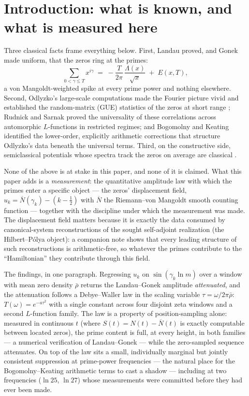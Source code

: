 \documentclass[11pt]{article}
\theoremstyle{definition}
\theoremstyle{remark}
\newcommand{\Nbar}{\overline{N}}
\begin{document}
\section{Introduction: what is known, and what is measured here}

Three classical facts frame everything below. First, Landau \cite{Landau} proved, and Gonek
\cite{Gonek} made uniform, that the zeros ring at the primes:
\[
\sum_{0<\gamma\le T} x^{i\gamma} \;=\; -\frac{T}{2\pi}\,\frac{\Lambda(x)}{\sqrt{x}} \;+\; E(x,T),
\]
a von Mangoldt-weighted spike at every prime power and nothing elsewhere. Second, Odlyzko's
large-scale computations \cite{Odlyzko87,OdlyzkoEssay} made the Fourier picture vivid and
established the random-matrix (GUE) statistics of the zeros at short range \cite{Montgomery};
Rudnick and Sarnak \cite{RudnickSarnak} proved the universality of these correlations across
automorphic $L$-functions in restricted regimes; and Bogomolny and Keating \cite{BK1,BK2}
identified the lower-order, explicitly arithmetic corrections that structure Odlyzko's data beneath
the universal terms. Third, on the constructive side, semiclassical potentials whose spectra track
the zeros on average are classical \cite{WuSprung,SchHutch,Berry88,BerryKeating}.

None of the above is at stake in this paper, and none of it is claimed. What this paper adds is a
\emph{measurement}: the quantitative amplitude law with which the primes enter a specific object
--- the zeros' displacement field, $u_k = \Nbar(\gamma_k) - (k - \tfrac12)$ with $\Nbar$ the
Riemann--von Mangoldt smooth counting function --- together with the discipline under which the
measurement was made. The displacement field matters because it is exactly the data consumed by
canonical-system reconstructions of the sought self-adjoint realization (the Hilbert--P\'olya
object): a companion note \cite{Note4} shows that every leading structure of such reconstructions
is arithmetic-free, so whatever the primes contribute to the ``Hamiltonian'' they contribute
through this field.

The findings, in one paragraph. Regressing $u_k$ on $\sin(\gamma_k \ln m)$ over a window with mean
zero density $\bar\rho$ returns the Landau--Gonek amplitude \emph{attenuated}, and the attenuation
follows a Debye--Waller law in the scaling variable $\tau = \omega/2\pi\bar\rho$:
$T(\omega) = e^{-a\tau^2}$ with a single constant across four disjoint zeta windows and a second
$L$-function family. The law is a property of position-sampling alone: measured in continuous $t$
(where $S(t) = N(t) - \Nbar(t)$ is exactly computable between located zeros), the prime content is
full, at every height, in both families --- a numerical verification of Landau--Gonek --- while the
zero-sampled sequence attenuates. On top of the law sits a small, individually marginal but
jointly consistent suppression at prime-power frequencies --- the natural place for the
Bogomolny--Keating arithmetic terms to cast a shadow --- including at two frequencies
($\ln 25$, $\ln 27$) whose measurements were committed before they had ever been made.
\end{document}

